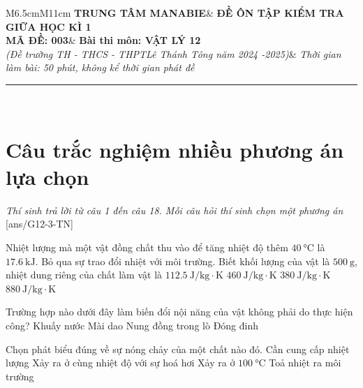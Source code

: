 \begin{tabular}{M{6.5cm}M{11cm}}
	\textbf{TRUNG TÂM MANABIE}& \textbf{ĐỀ ÔN TẬP KIỂM TRA GIỮA HỌC KÌ 1}\\
	\textbf{MÃ ĐỀ: 003}& \textbf{Bài thi môn: VẬT LÝ 12}\\
	\textit{(Đề trường TH - THCS - THPT\newline Lê Thánh Tông năm 2024 -2025)}& \textit{Thời gian làm bài: 50 phút, không kể thời gian phát đề}
	
	\noindent\rule{4cm}{0.8pt} \\
\end{tabular}
\setcounter{section}{0}
\section{Câu trắc nghiệm nhiều phương án lựa chọn}
\textit{Thí sinh trả lời từ câu 1 đến câu 18. Mỗi câu hỏi thí sinh chọn một phương án}
\setcounter{ex}{0}
[ans/G12-3-TN]
\begin{ex}
	Nhiệt lượng mà một vật đồng chất thu vào để tăng nhiệt độ thêm $\SI{40}{\celsius}$ là $\SI{17.6}{\kilo\joule}$. Bỏ qua sự trao đổi nhiệt với môi trường. Biết khối lượng của vật là $\SI{500}{\gram}$, nhiệt dung riêng của chất làm vật là	
	\choice
	{$\SI{112.5}{\joule/\kilogram\cdot\kelvin}$}
	{$\SI{460}{\joule/\kilogram\cdot\kelvin}$}
	{$\SI{380}{\joule/\kilogram\cdot\kelvin}$}
	{\True $\SI{880}{\joule/\kilogram\cdot\kelvin}$}
\end{ex}
\begin{ex}
	Trường hợp nào dưới đây làm biến đổi nội năng của vật không phải do thực hiện công?
	\choice
	{Khuấy nước}
	{Mài dao}
	{\True Nung đồng trong lò}
	{Đóng đinh}
	\loigiai{}
\end{ex}
\begin{ex}
	Chọn phát biểu đúng về sự nóng chảy của một chất nào đó.
	\choice
	{\True Cần cung cấp nhiệt lượng}
	{Xảy ra ở cùng nhiệt độ với sự hoá hơi}
	{Xảy ra ở $\SI{100}{\celsius}$}
	{Toả nhiệt ra môi trường}
	\loigiai{}
\end{ex}
